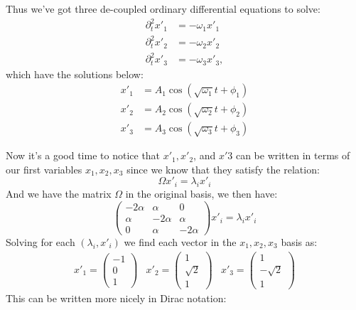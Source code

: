 \documentclass[10pt,twocoloumn]{article}
\begin{document}
Thus we've got three de-coupled ordinary differential equations to solve:
\begin{align}
    \partial_t^2 x'_1 &= -\omega_1 x'_1 \\
    \partial_t^2 x'_2 &= -\omega_2 x'_2\\
    \partial_t^2 x'_3 &= -\omega_3 x'_3,
\end{align}
which have the solutions below:
\begin{align}
    x'_1 &= A_1\cos(\sqrt{\omega_1} t + \phi_1)\\
    x'_2 &= A_2 \cos(\sqrt{\omega_2} t + \phi_2)\\
    x'_3 &= A_3 \cos(\sqrt{\omega_3} t + \phi_3)
\end{align}

Now it's a good time to notice that $x'_1,x'_2$, and $x'3$ can be written in terms of our first variables $x_1,x_2,x_3$ since we know that they satisfy the relation:
\begin{equation}
    \Omega x'_i = \lambda_i x'_i
\end{equation}
And we have the matrix $\Omega$ in the original basis, we then have:
\begin{equation}
    \begin{pmatrix}
        -2\alpha & \alpha & 0 \\
        \alpha &-2\alpha & \alpha \\
        0 &\alpha &-2\alpha
    \end{pmatrix}x'_i = \lambda_i x'_i
\end{equation}
Solving for each $(\lambda_i,x'_i)$ we find each vector in the $x_1,x_2,x_3$ basis as:
\begin{equation}
    \begin{matrix}
        x'_1 = \begin{pmatrix} -1 \\ 0 \\ 1 \end{pmatrix} & x'_2 = \begin{pmatrix} 1 \\ \sqrt 2 \\ 1 \end{pmatrix}
        & x'_3 = \begin{pmatrix} 1 \\ -\sqrt 2 \\ 1 \end{pmatrix}
    \end{matrix}
\end{equation}
This can be written more nicely in Dirac notation:
\end{document}
